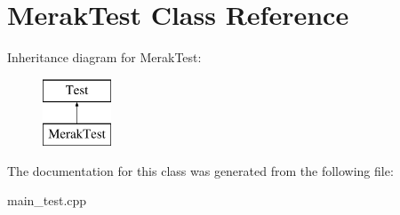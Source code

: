 \hypertarget{class_merak_test}{}\section{Merak\+Test Class Reference}
\label{class_merak_test}
Inheritance diagram for Merak\+Test\+:\begin{figure}[H]
\begin{center}
\leavevmode
\includegraphics[height=2.000000cm]{class_merak_test}
\end{center}
\end{figure}


The documentation for this class was generated from the following file\+:\begin{DoxyCompactItemize}
\item 
main\+\_\+test.\+cpp\end{DoxyCompactItemize}
